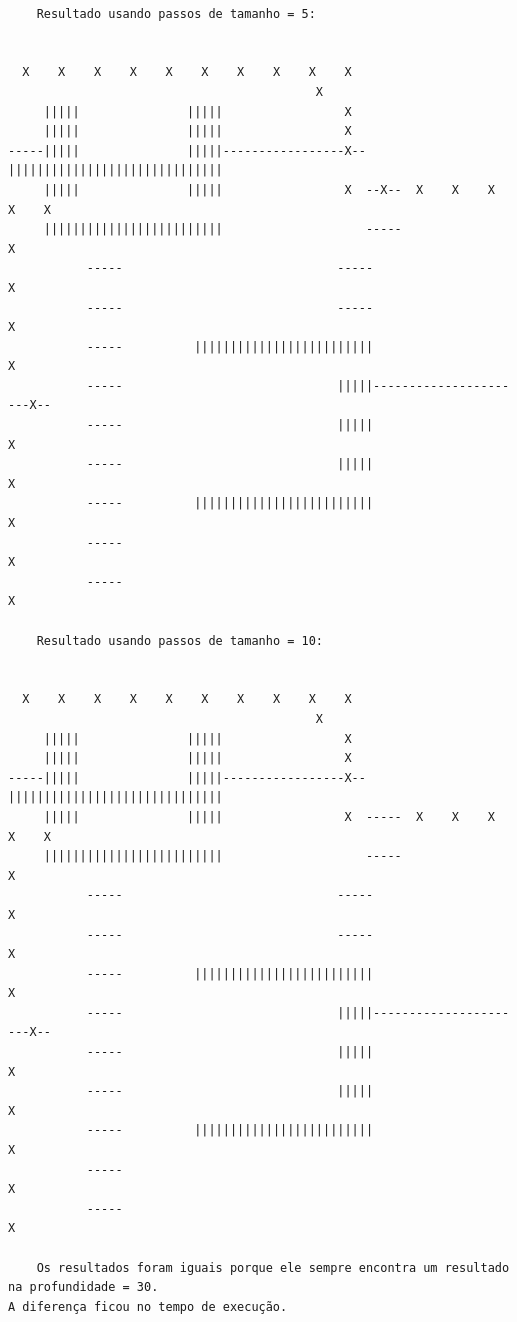 \documentclass[10pt]{article}
\begin{document}
\begin{verbatim}

	Resultado usando passos de tamanho = 5:


  X    X    X    X    X    X    X    X    X    X
	                                       X
     |||||               |||||                 X
     |||||               |||||                 X
-----|||||               |||||-----------------X--||||||||||||||||||||||||||||||
     |||||               |||||                 X  --X--  X    X    X    X    X
     |||||||||||||||||||||||||                    -----                      X
	       -----                              -----                      X
	       -----                              -----                      X
	       -----          |||||||||||||||||||||||||                      X
	       -----                              |||||----------------------X--
	       -----                              |||||                      X
	       -----                              |||||                      X
	       -----          |||||||||||||||||||||||||                      X
	       -----                                                         X
	       -----                                                         X

	Resultado usando passos de tamanho = 10:


  X    X    X    X    X    X    X    X    X    X
	                                       X
     |||||               |||||                 X
     |||||               |||||                 X
-----|||||               |||||-----------------X--||||||||||||||||||||||||||||||
     |||||               |||||                 X  -----  X    X    X    X    X
     |||||||||||||||||||||||||                    -----                      X
	       -----                              -----                      X
	       -----                              -----                      X
	       -----          |||||||||||||||||||||||||                      X
	       -----                              |||||----------------------X--
	       -----                              |||||                      X
	       -----                              |||||                      X
	       -----          |||||||||||||||||||||||||                      X
	       -----                                                         X
	       -----                                                         X

	Os resultados foram iguais porque ele sempre encontra um resultado na profundidade = 30.
A diferença ficou no tempo de execução.
\end{verbatim}
\end{document}
